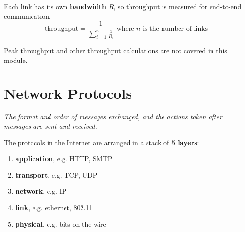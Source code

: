 Each link has its own \textbf{bandwidth} $R$, so throughput is measured for end-to-end communication.\\
\begin{equation*}
    \text{throughput} = \frac{1}{\sum_{i=1}^{n} \frac{1}{R_{i}}} \text{ where $n$ is the number of links}
\end{equation*}

Peak throughput and other throughput calculations are not covered in this module.

\section{Network Protocols}
\emph{The format and order of messages exchanged, and the actions taken after messages are sent and received.}

The protocols in the Internet are arranged in a stack of \textbf{5 layers}:
\begin{enumerate}
    \item \textbf{application}, e.g. HTTP, SMTP
    \item \textbf{transport}, e.g. TCP, UDP
    \item \textbf{network}, e.g. IP
    \item \textbf{link}, e.g. ethernet, 802.11
    \item \textbf{physical}, e.g. bits on the wire
\end{enumerate}